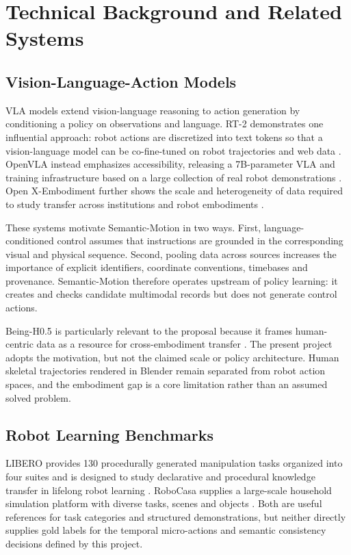 \documentclass[11pt,oneside]{report}
\begin{document}
\chapter{Technical Background and Related Systems}
\section{Vision-Language-Action Models}
VLA models extend vision-language reasoning to action generation by conditioning
a policy on observations and language. RT-2 demonstrates one influential
approach: robot actions are discretized into text tokens so that a
vision-language model can be co-fine-tuned on robot trajectories and web data
\cite{zitkovich2023rt2}. OpenVLA instead emphasizes accessibility, releasing a
7B-parameter VLA and training infrastructure based on a large collection of
real robot demonstrations \cite{kim2024openvla}. Open X-Embodiment further
shows the scale and heterogeneity of data required to study transfer across
institutions and robot embodiments \cite{openx2024}.

These systems motivate Semantic-Motion in two ways. First, language-conditioned
control assumes that instructions are grounded in the corresponding visual and
physical sequence. Second, pooling data across sources increases the importance
of explicit identifiers, coordinate conventions, timebases and provenance.
Semantic-Motion therefore operates upstream of policy learning: it creates and
checks candidate multimodal records but does not generate control actions.

Being-H0.5 is particularly relevant to the proposal because it frames
human-centric data as a resource for cross-embodiment transfer
\cite{luo2026beingh05}. The present project adopts the motivation, but not the
claimed scale or policy architecture. Human skeletal trajectories rendered in
Blender remain separated from robot action spaces, and the embodiment gap is a
core limitation rather than an assumed solved problem.

\section{Robot Learning Benchmarks}
LIBERO provides 130 procedurally generated manipulation tasks organized into
four suites and is designed to study declarative and procedural knowledge
transfer in lifelong robot learning \cite{liu2023libero}. RoboCasa supplies a
large-scale household simulation platform with diverse tasks, scenes and
objects \cite{nasiriany2024robocasa}. Both are useful references for task
categories and structured demonstrations, but neither directly supplies gold
labels for the temporal micro-actions and semantic consistency decisions
defined by this project.
\end{document}
